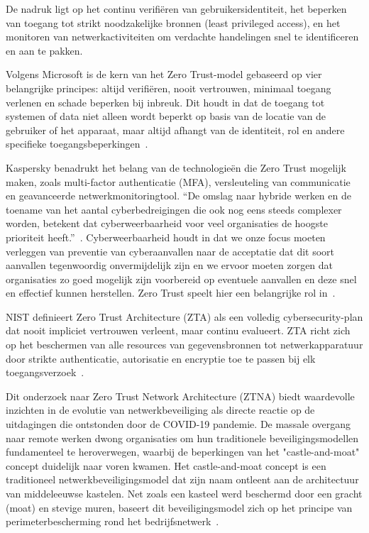 \vspace{2ex}

De nadruk ligt op het continu verifiëren van gebruikersidentiteit, het beperken van toegang tot strikt noodzakelijke bronnen (least privileged access), en het monitoren van netwerkactiviteiten om verdachte handelingen snel te identificeren en aan te pakken.

\vspace{2ex}

Volgens Microsoft is de kern van het Zero Trust-model gebaseerd op vier belangrijke principes: altijd verifiëren, nooit vertrouwen, minimaal toegang verlenen en schade beperken bij inbreuk. Dit houdt in dat de toegang tot systemen of data niet alleen wordt beperkt op basis van de locatie van de gebruiker of het apparaat, maar altijd afhangt van de identiteit, rol en andere specifieke toegangsbeperkingen~\autocite{Microsoft2024}. 

\vspace{2ex}

Kaspersky benadrukt het belang van de technologieën die Zero Trust mogelijk maken, zoals multi-factor authenticatie (MFA), versleuteling van communicatie en geavanceerde netwerkmonitoringtool. ``De omslag naar hybride werken en de toename van het aantal cyberbedreigingen die ook nog eens steeds complexer worden, betekent dat cyberweerbaarheid voor veel organisaties de hoogste prioriteit heeft.''~\autocite{Kaspersky2024}. Cyberweerbaarheid houdt in dat we onze focus moeten verleggen van preventie van cyberaanvallen naar de acceptatie dat dit soort aanvallen tegenwoordig onvermijdelijk zijn en we ervoor moeten zorgen dat organisaties zo goed mogelijk zijn voorbereid op eventuele aanvallen en deze snel en effectief kunnen herstellen. Zero Trust speelt hier een belangrijke rol in~\autocite{Kaspersky2024}.

\vspace{2ex}

NIST definieert Zero Trust Architecture (ZTA) als een volledig cybersecurity-plan dat nooit impliciet vertrouwen verleent, maar continu evalueert. ZTA richt zich op het beschermen van alle resources van gegevensbronnen tot netwerkapparatuur door strikte authenticatie, autorisatie en encryptie toe te passen bij elk toegangsverzoek~\autocite{NIST2020}.

\vspace{2ex}

Dit onderzoek naar Zero Trust Network Architecture (ZTNA) biedt waardevolle inzichten in de evolutie van netwerkbeveiliging als directe reactie op de uitdagingen die ontstonden door de COVID-19 pandemie. De massale overgang naar remote werken dwong organisaties om hun traditionele beveiligingsmodellen fundamenteel te heroverwegen, waarbij de beperkingen van het "castle-and-moat" concept duidelijk naar voren kwamen. Het castle-and-moat concept is een traditioneel netwerkbeveiligingsmodel dat zijn naam ontleent aan de architectuur van middeleeuwse kastelen. Net zoals een kasteel werd beschermd door een gracht (moat) en stevige muren, baseert dit beveiligingsmodel zich op het principe van perimeterbescherming rond het bedrijfsnetwerk~\autocite{Deshpande-2021}. 

